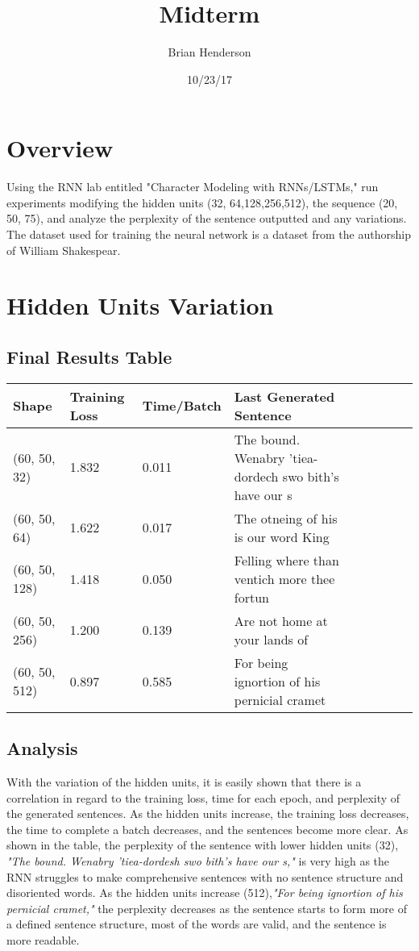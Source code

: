 \documentclass[a4paper]{article}
\title{Midterm}
\author{Brian Henderson}
\date{10/23/17}
\begin{document}
\lstset{language=Python}

\maketitle

\section{Overview}
	Using the RNN lab entitled "Character Modeling with RNNs/LSTMs," run experiments modifying the hidden units (32, 64,128,256,512), the sequence (20, 50, 75), and analyze the perplexity of the sentence outputted and any variations. The dataset used for training the neural network is a dataset from the authorship of William Shakespear.
\\
\section{Hidden Units Variation}
\subsection{Final Results Table}
\begin{tabular}{l*{8}l}
Shape  & Training Loss & Time/Batch & Last Generated Sentence\\
\hline
(60, 50, 32)	& 1.832 & 0.011 & The bound. Wenabry 'tiea-dordech swo bith's have our s \\
(60, 50, 64)	& 1.622 & 0.017 & The otneing of his is our word King \\
(60, 50, 128)	& 1.418 & 0.050 & Felling where than ventich more thee fortun \\
(60, 50, 256)	& 1.200 & 0.139 & Are not home at your lands of \\
(60, 50, 512)	& 0.897 & 0.585 & For being ignortion of his pernicial cramet \\

\end{tabular}


\subsection{Analysis}

	With the variation of the hidden units, it is easily shown that there is a correlation in regard to the training loss, time for each epoch, and perplexity of the generated sentences. As the hidden units increase, the training loss decreases, the time to complete a batch decreases, and the sentences become more clear. As shown in the table, the perplexity of the sentence with lower hidden units (32), \textit{"The bound. Wenabry 'tiea-dordesh swo bith's have our s,"} is very high as the RNN struggles to make comprehensive sentences with no sentence structure and disoriented words. As the hidden units increase (512),\textit{"For being ignortion of his pernicial cramet,"} the perplexity decreases as the sentence starts to form more of a defined sentence structure, most of the words are valid, and the sentence is more readable. 
    
\end{document}
